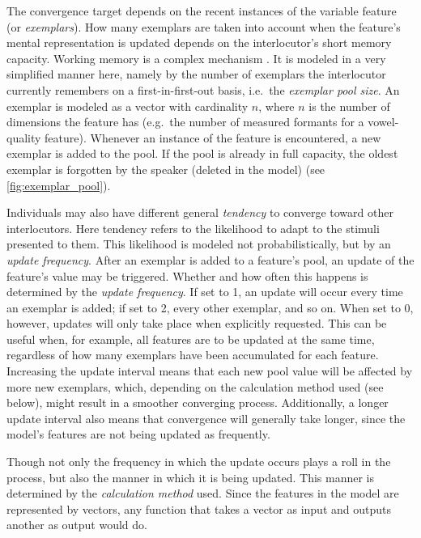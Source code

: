 The convergence target depends on the recent instances of the variable feature (or \textit{exemplars}).
How many exemplars are taken into account when the feature's mental representation is updated depends on the interlocutor's short memory capacity.
Working memory is a complex mechanism
.
It is modeled in a very simplified manner here, namely by the number of exemplars the interlocutor currently remembers on a first-in-first-out basis, i.e.~the \textit{exemplar pool size}.
An exemplar is modeled as a vector with cardinality $n$, where $n$ is the number of dimensions the feature has (e.g.~the number of measured formants for a vowel-quality feature).
Whenever an instance of the feature is encountered, a new exemplar is added to the pool.
If the pool is already in full capacity, the oldest exemplar is forgotten by the speaker (deleted in the model) (see \cref{fig:exemplar_pool}).

Individuals may also have different general \textit{tendency} to converge toward other interlocutors.
Here tendency refers to the likelihood to adapt to the stimuli presented to them.
This likelihood is modeled not probabilistically, but by an \textit{update frequency}.
After an exemplar is added to a feature's pool, an update of the feature's value may be triggered.
Whether and how often this happens is determined by the \textit{update frequency}.
If set to 1, an update will occur every time an exemplar is added; if set to 2, every other exemplar, and so on.
When set to 0, however, updates will only take place when explicitly requested.
This can be useful when, for example, all features are to be updated at the same time, regardless of how many exemplars have been accumulated for each feature.
Increasing the update interval means that each new pool value will be affected by more new exemplars, which, depending on the calculation method used (see below), might result in a smoother converging process.
Additionally, a longer update interval also means that convergence will generally take longer, since the model's features are not being updated as frequently.

Though not only the frequency in which the update occurs plays a roll in the process, but also the manner in which it is being updated.
This manner is determined by the \textit{calculation method} used.
Since the features in the model are represented by vectors, any function that takes a vector as input and outputs another as output would do.

